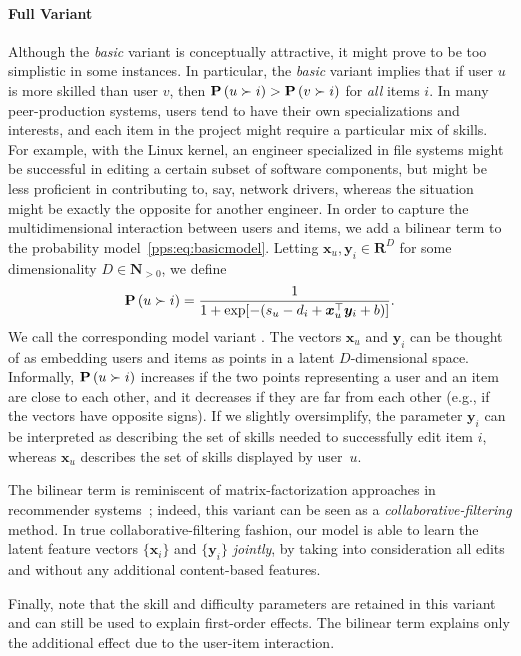 \paragraph{Full Variant}
Although the \emph{basic} variant is conceptually attractive, it might prove to be too simplistic in some instances.
In particular, the \emph{basic} variant implies that if user $u$ is more skilled than user $v$, then $\mathbf{P}\left( u \succ i \right) > \mathbf{P}\left( v \succ i \right)$ for \emph{all} items $i$.
In many peer-production systems, users tend to have their own specializations and interests, and each item in the project might require a particular mix of skills.
For example, with the Linux kernel, an engineer specialized in file systems might be successful in editing a certain subset of software components, but might be less proficient in contributing to, say, network drivers, whereas the situation might be exactly the opposite for another engineer.
In order to capture the multidimensional interaction between users and items, we add a bilinear term to the probability model~\eqref{pps:eq:basicmodel}.
Letting $\bm{x}_u, \bm{y}_i \in \mathbf{R}^D$ for some dimensionality $D \in \mathbf{N}_{>0}$, we define
\begin{align}
	\label{pps:eq:fullmodel}
	\mathbf{P}\left( u \succ i \right) = \frac{1}{1 + \exp[-(s_u - d_i + \bm{x}_u^\top \bm{y}_i + b)]}.
\end{align}
We call the corresponding model variant .
The vectors $\bm{x}_u$ and $\bm{y}_i$ can be thought of as embedding users and items as points in a latent $D$-dimensional space.
Informally, $\mathbf{P}\left( u \succ i \right)$ increases if the two points representing a user and an item are close to each other, and it decreases if they are far from each other (e.g., if the vectors have opposite signs).
If we slightly oversimplify, the parameter $\bm{y}_i$ can be interpreted as describing the set of skills needed to successfully edit item $i$, whereas $\bm{x}_u$ describes the set of skills displayed by user~$u$.

The bilinear term is reminiscent of matrix-factorization approaches in recommender systems~\citep{koren2009matrix};
indeed, this variant can be seen as a \emph{collaborative-filtering} method.
In true collaborative-filtering fashion, our model is able to learn the latent feature vectors $\{ \bm{x}_i \}$ and $\{ \bm{y}_i \}$ \emph{jointly}, by taking into consideration all edits and without any additional content-based features.

Finally, note that the skill and difficulty parameters are retained in this variant and can still be used to explain first-order effects.
The bilinear term explains only the additional effect due to the user-item interaction.

